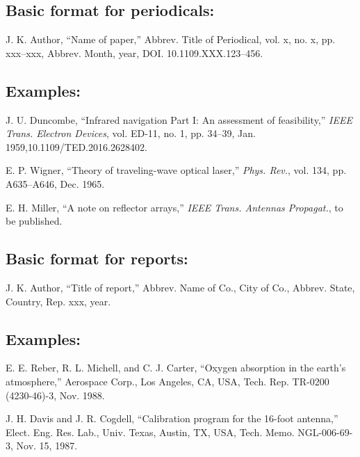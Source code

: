 \documentclass[journal]{IEEEtran}
\begin{document}
\subsection*{Basic format for periodicals:}

J. K. Author, ``Name of paper,'' Abbrev. Title of Periodical, vol. x,   no. x, pp. xxx--xxx, Abbrev. Month, year, DOI. 10.1109.XXX.123--456.

\subsection*{Examples:}

\begin{thebibliography}{34}
\setcounter{enumiv}{2}

\bibitem{}J. U. Duncombe, ``Infrared navigation Part I: An assessment of feasibility,'' {\em IEEE Trans. Electron Devices}, vol. ED-11, no. 1, pp. 34--39, Jan. 1959,10.1109/TED.2016.2628402.

\bibitem{}E. P. Wigner, ``Theory of traveling-wave optical laser,''
{\em Phys. Rev.},  vol. 134, pp. A635--A646, Dec. 1965.

\bibitem{}E. H. Miller, ``A note on reflector arrays,'' {\em IEEE Trans. Antennas Propagat.}, to be published.
\end{thebibliography}


\subsection*{Basic format for reports:}

J. K. Author, ``Title of report,'' Abbrev. Name of Co., City of Co., Abbrev. State, Country, Rep. xxx, year.

\subsection*{Examples:}
\begin{thebibliography}{34}
\setcounter{enumiv}{5}

\bibitem{} E. E. Reber, R. L. Michell, and C. J. Carter, ``Oxygen absorption in the earth’s atmosphere,'' Aerospace Corp., Los Angeles, CA, USA, Tech. Rep. TR-0200 (4230-46)-3, Nov. 1988.

\bibitem{} J. H. Davis and J. R. Cogdell, ``Calibration program for the 16-foot antenna,'' Elect. Eng. Res. Lab., Univ. Texas, Austin, TX, USA, Tech. Memo. NGL-006-69-3, Nov. 15, 1987.
\end{thebibliography}
\end{document}

